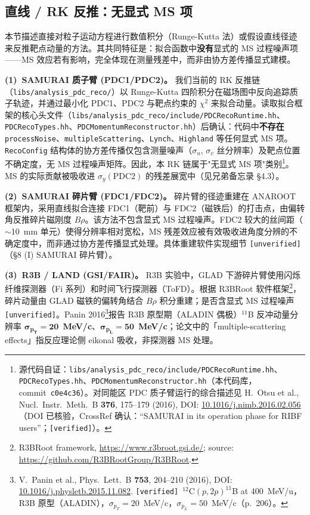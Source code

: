 \documentclass[a4paper, 11pt]{article}
\begin{document}
\subsection{直线 / RK 反推：无显式 MS 项}
\label{sec:algo_rk}

本节描述直接对粒子运动方程进行数值积分（Runge-Kutta 法）或假设直线径迹来反推靶点动量的方法。其共同特征是：拟合函数中\textbf{没有}显式的 MS 过程噪声项——MS 效应若有影响，完全体现在测量残差中，而非由协方差传播显式建模。

\textbf{(1)~SAMURAI 质子臂 (PDC1/PDC2)。}
我们当前的 RK 反推链（\texttt{libs/analysis\_pdc\_reco/}）以 Runge-Kutta 四阶积分在磁场图中反向追踪质子轨迹，并通过最小化 PDC1、PDC2 与靶点约束的 $\chi^2$ 来拟合动量。读取拟合框架的核心头文件（\texttt{libs/analysis\_pdc\_reco/include/PDCRecoRuntime.hh}、\texttt{PDCRecoTypes.hh}、\texttt{PDCMomentumReconstructor.hh}）后确认：代码中\textbf{不存在} \texttt{processNoise}、\texttt{multipleScattering}、\texttt{Lynch}、\texttt{Highland} 等任何显式 MS 项。\texttt{RecoConfig} 结构体的协方差传播仅包含测量噪声（$\sigma_u$, $\sigma_v$ 丝分辨率）及靶点位置不确定度，无 MS 过程噪声矩阵。因此，本 RK 链属于"无显式 MS 项"类别\footnote{\label{fn:src_pdc_rk}源代码自证：\texttt{libs/analysis\_pdc\_reco/include/PDCRecoRuntime.hh}、\texttt{PDCRecoTypes.hh}、\texttt{PDCMomentumReconstructor.hh}（本代码库，commit~\texttt{c0e4c36}）。对同能区 PDC 质子臂运行的综合描述见 H.~Otsu et al., Nucl.\ Instr.\ Meth.\ B \textbf{376}, 175--179 (2016), DOI: \href{https://doi.org/10.1016/j.nimb.2016.02.056}{10.1016/j.nimb.2016.02.056}（DOI 已核验，CrossRef 确认：``SAMURAI in its operation phase for RIBF users''；\texttt{[verified]}）。}。MS 的实际贡献被吸收进 $\sigma_y(\text{PDC2})$ 的残差展宽中（见兄弟备忘录 §4.3）。

\textbf{(2)~SAMURAI 碎片臂 (FDC1/FDC2)。}
碎片臂的径迹重建在 ANAROOT 框架内，采用直线拟合连接 FDC1（靶前）与 FDC2（磁铁后）的打击点，由偏转角反推碎片磁刚度 $B\rho$。该方法不包含显式 MS 过程噪声。FDC2 较大的丝间距（$\sim$10~mm 单元）使得分辨率相对宽松，MS 残差效应被有效吸收进角度分辨的不确定度中，而非通过协方差传播显式处理。具体重建软件实现细节 \texttt{[unverified]}（§8 (I) SAMURAI 碎片臂）。

\textbf{(3)~R3B / LAND (GSI/FAIR)。}
R3B 实验中，GLAD 下游碎片臂使用闪烁纤维探测器（Fi 系列）和时间飞行探测器（ToFD）。根据 R3BRoot 软件框架\footnote{\label{fn:r3broot}R3BRoot framework, \url{https://www.r3broot.gsi.de/}; source: \url{https://github.com/R3BRootGroup/R3BRoot}.}，碎片动量由 GLAD 磁铁的偏转角结合 $B\rho$ 积分重建；是否含显式 MS 过程噪声 \texttt{[unverified]}。Panin 2016\footnote{\label{fn:panin2016}V.~Panin et al., Phys.\ Lett.\ B \textbf{753}, 204--210 (2016), DOI: \href{https://doi.org/10.1016/j.physletb.2015.11.082}{10.1016/j.physletb.2015.11.082}. \texttt{[verified]}~$^{12}$C$(p,2p)^{11}$B at 400~MeV/u，R3B 原型（ALADIN），$\sigma_{p_T}=20$~MeV/c，$\sigma_{p_L}=50$~MeV/c（p.~206）。}报告 R3B 原型期（ALADIN 偶极）$^{11}$B 反冲动量分辨率 $\boldsymbol{\sigma_{p_T}=20}$~\textbf{MeV/c}、$\boldsymbol{\sigma_{p_L}=50}$~\textbf{MeV/c}；论文中的「multiple-scattering effects」指反应理论侧 eikonal 吸收，非探测器 MS 处理。
\end{document}
